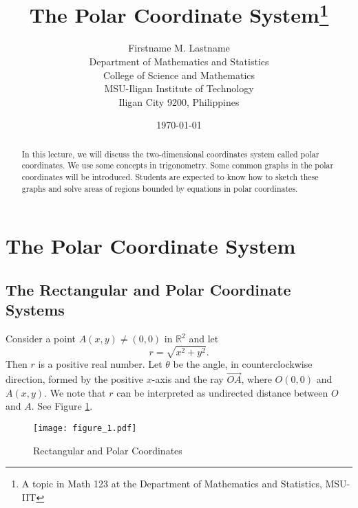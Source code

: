 \documentclass[12pt,twoside]{article}
\begin{document}
\title{The Polar Coordinate System\footnote{A topic in Math 123 at the Department of Mathematics and Statistics, MSU-IIT}}
\author{{\sffamily Firstname M. Lastname}\\
Department of Mathematics and Statistics\\College of Science and Mathematics\\MSU-Iligan Institute of Technology\\Iligan City 9200, Philippines}
\date{\today}
\maketitle
\tableofcontents
\begin{abstract}
In this lecture, we will discuss the two-dimensional coordinates system called polar coordinates. We use some concepts in trigonometry. Some common graphs in the polar coordinates will be introduced. Students are expected to know how to sketch these graphs and solve areas of regions bounded by equations in polar coordinates.
\end{abstract}
\section{The Polar Coordinate System}

\subsection{The Rectangular and Polar Coordinate Systems}

Consider a point $A(x,y)\neq(0,0)$ in $\mathbb{R}^2$ and let
\begin{equation}\label{eqn:complexr}
r=\sqrt{x^2+y^2}.
\end{equation}
Then $r$ is a positive real number. Let $\theta$ be the angle, in counterclockwise direction, formed by the positive $x$-axis and the ray $\overrightarrow{OA}$, where $O(0,0)$ and $A(x,y)$. We note that $r$ can be interpreted as undirected distance between $O$ and $A$. See Figure \ref{fig:complexpolar}.

\begin{figure}[h]
\begin{center}
\texttt{[image: figure\_1.pdf]}
\end{center}
\vspace{-24pt}
\caption{Rectangular and Polar Coordinates} 
\label{fig:complexpolar}
\end{figure}
\end{document}
